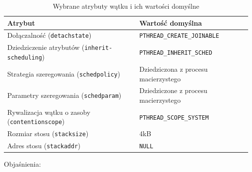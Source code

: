 \begin{table}[h!]
\centering
\caption{Wybrane atrybuty wątku i ich wartości domyślne}
\setlength{\arrayrulewidth}{1pt}
\setlength{\tabcolsep}{6pt}
\renewcommand{\arraystretch}{1.2}
\begin{tabular}{ |p{}|p{}| }
\hline \rowcolor{gray}
\textbf{Atrybut} & \textbf{Wartość domyślna} \\ \hline
Dołączalność (\mbox{\lstinline[style=MyCStyle]{detachstate}}) & \mbox{\lstinline[style=MyCStyle]{PTHREAD_CREATE_JOINABLE}} \\ \hline
Dziedziczenie atrybutów (\mbox{\lstinline[style=MyCStyle]{inherit-scheduling}}) & \mbox{\lstinline[style=MyCStyle]{PTHREAD_INHERIT_SCHED}} \\ \hline
Strategia szeregowania (\mbox{\lstinline[style=MyCStyle]{schedpolicy}}) & Dziedziczona z procesu macierzystego \\ \hline
Parametry szeregowania (\mbox{\lstinline[style=MyCStyle]{schedparam}}) & Dziedziczone z procesu macierzystego \\ \hline
Rywalizacja wątku o zasoby (\mbox{\lstinline[style=MyCStyle]{contentionscope}}) & \mbox{\lstinline[style=MyCStyle]{PTHREAD_SCOPE_SYSTEM}} \\ \hline
Rozmiar stosu (\mbox{\lstinline[style=MyCStyle]{stacksize}}) & 4kB \\ \hline
Adres stosu (\mbox{\lstinline[style=MyCStyle]{stackaddr}}) & \mbox{\lstinline[style=MyCStyle]{NULL}} \\ \hline
\end{tabular}
\label{tab:atrybuty1}
\end{table}


Objaśnienia:

